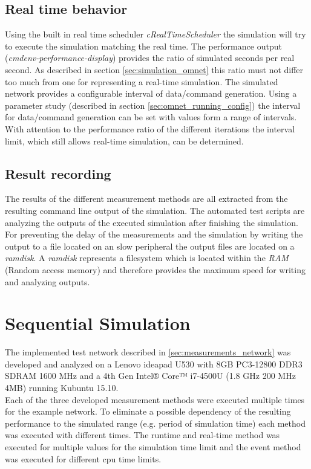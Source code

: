 \subsection{Real time behavior}
\label{sec:measurements_methods_realtime}
Using the built in real time scheduler \emph{cRealTimeScheduler} the simulation will try to execute the simulation matching the real time.
The performance output (\emph{cmdenv-performance-display}) provides the ratio of simulated seconds per real second.
As described in section \ref{sec:simulation_omnet} this ratio must not differ too much from one for representing a real-time simulation.
The simulated network provides a configurable interval of data/command generation.
Using a parameter study (described in section \ref{sec:omnet_running_config}) the interval for data/command generation can be set with values form a range of intervals.
With attention to the performance ratio of the different iterations the interval limit, which still allows real-time simulation, can be determined.

\subsection{Result recording}
The results of the different measurement methods are all extracted from the resulting command line output of the simulation.
The automated test scripts are analyzing the outputs of the executed simulation after finishing the simulation.
For preventing the delay of the measurements and the simulation by writing the output to a file located on an slow peripheral the output files are located on a \emph{ramdisk}.
A \emph{ramdisk} represents a filesystem which is located within the \emph{RAM} (Random access memory) and therefore provides the maximum speed for writing and analyzing outputs.

\section{Sequential Simulation}
\label{sec:measurements_sequential}
The implemented test network described in \ref{sec:measurements_network} was developed and analyzed on a Lenovo ideapad U530 with 8GB PC3-12800 DDR3 SDRAM 1600 MHz and a 4th Gen Intel® Core™ i7-4500U (1.8 GHz 200 MHz 4MB) running Kubuntu 15.10.
\cite{lenovo_spec}\\


Each of the three developed measurement methods were executed multiple times for the example network.
To eliminate a possible dependency of the resulting performance to the simulated range (e.g. period of simulation time) each method was executed with different times.
The runtime and real-time method was executed for multiple values for the simulation time limit and the event method was executed for different cpu time limits.

